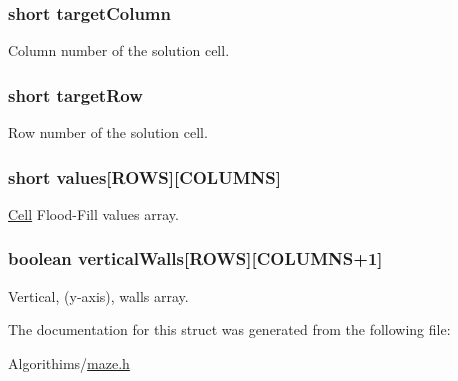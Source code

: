 \subsubsection[{target\+Column}]{\setlength{\rightskip}{0pt plus 5cm}short target\+Column}\label{struct_maze_a9766593afcd1e7190fa595580d22c361}
Column number of the solution cell. \hypertarget{struct_maze_a1458fbf99b584cba92836ab88ee6f8a5}{}
\subsubsection[{target\+Row}]{\setlength{\rightskip}{0pt plus 5cm}short target\+Row}\label{struct_maze_a1458fbf99b584cba92836ab88ee6f8a5}
Row number of the solution cell. \hypertarget{struct_maze_a9755fe6553e3536eb0e84a8c21a3957e}{}
\subsubsection[{values}]{\setlength{\rightskip}{0pt plus 5cm}short values\mbox{[}R\+O\+W\+S\mbox{]}\mbox{[}C\+O\+L\+U\+M\+N\+S\mbox{]}}\label{struct_maze_a9755fe6553e3536eb0e84a8c21a3957e}
\hyperlink{struct_cell}{Cell} Flood-\/\+Fill values array. \hypertarget{struct_maze_a0b1e65db462f021fc50daaea40d51037}{}
\subsubsection[{vertical\+Walls}]{\setlength{\rightskip}{0pt plus 5cm}boolean vertical\+Walls\mbox{[}R\+O\+W\+S\mbox{]}\mbox{[}C\+O\+L\+U\+M\+N\+S+1\mbox{]}}\label{struct_maze_a0b1e65db462f021fc50daaea40d51037}
Vertical, (y-\/axis), walls array. 

The documentation for this struct was generated from the following file\+:\begin{DoxyCompactItemize}
\item 
Algorithims/\hyperlink{maze_8h}{maze.\+h}\end{DoxyCompactItemize}
